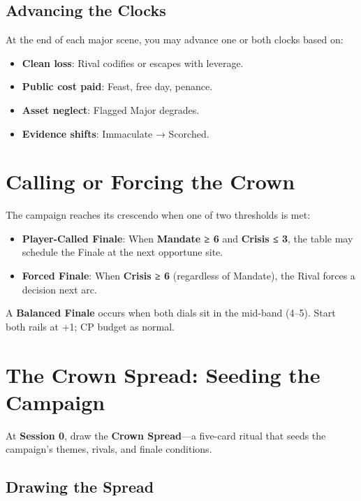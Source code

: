 \subsection*{Advancing the Clocks}

At the end of each major scene, you may advance one or both clocks based on:

\begin{itemize}
    \item \textbf{Clean loss}: Rival codifies or escapes with leverage.
    \item \textbf{Public cost paid}: Feast, free day, penance.
    \item \textbf{Asset neglect}: Flagged Major degrades.
    \item \textbf{Evidence shifts}: Immaculate → Scorched.
\end{itemize}

\section*{Calling or Forcing the Crown}

The campaign reaches its crescendo when one of two thresholds is met:

\begin{itemize}
    \item \textbf{Player-Called Finale}: When \textbf{Mandate ≥ 6} and \textbf{Crisis ≤ 3}, the table may schedule the Finale at the next opportune site.
    \item \textbf{Forced Finale}: When \textbf{Crisis ≥ 6} (regardless of Mandate), the Rival forces a decision next arc.
\end{itemize}

A \textbf{Balanced Finale} occurs when both dials sit in the mid-band (4–5). Start both rails at +1; CP budget as normal.

\section*{The Crown Spread: Seeding the Campaign}

At \textbf{Session 0}, draw the \textbf{Crown Spread}—a five-card ritual that seeds the campaign's themes, rivals, and finale conditions.

\subsection*{Drawing the Spread}

